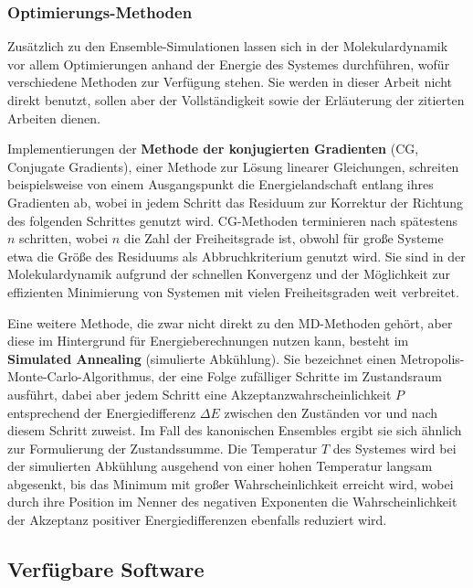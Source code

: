 \subsubsection{Optimierungs-Methoden}
\label{conjugategradient}
\label{annealing}

Zusätzlich zu den Ensemble-Simulationen lassen sich in der Molekulardynamik vor allem Optimierungen anhand der Energie des Systemes durchführen, wofür verschiedene Methoden zur Verfügung stehen.
Sie werden in dieser Arbeit nicht direkt benutzt, sollen aber der Vollständigkeit sowie der Erläuterung der zitierten Arbeiten dienen.

Implementierungen der \textbf{Methode der konjugierten Gradienten} (CG, Conjugate Gradients), einer Methode zur Lösung linearer Gleichungen, schreiten beispielsweise von einem Ausgangspunkt die Energielandschaft entlang ihres Gradienten ab, wobei in jedem Schritt das Residuum zur Korrektur der Richtung des folgenden Schrittes genutzt wird.
CG-Methoden terminieren nach spätestens $n$ schritten, wobei $n$ die Zahl der Freiheitsgrade ist, obwohl für große Systeme etwa die Größe des Residuums als Abbruchkriterium genutzt wird.
Sie sind in der Molekulardynamik aufgrund der schnellen Konvergenz und der Möglichkeit zur effizienten Minimierung von Systemen mit vielen Freiheitsgraden weit verbreitet.

Eine weitere Methode, die zwar nicht direkt zu den MD-Methoden gehört, aber diese im Hintergrund für Energieberechnungen nutzen kann, besteht im \textbf{Simulated Annealing} (simulierte Abkühlung).
Sie bezeichnet einen Metropolis-Monte-Carlo-Algorithmus, der eine Folge zufälliger Schritte im Zustandsraum ausführt, dabei aber jedem Schritt eine Akzeptanzwahrscheinlichkeit $P$ entsprechend der Energiedifferenz $\Delta E$ zwischen den Zuständen vor und nach diesem Schritt zuweist.
Im Fall des kanonischen Ensembles ergibt sie sich ähnlich zur Formulierung der Zustandssumme.
Die Temperatur $T$ des Systemes wird bei der simulierten Abkühlung ausgehend von einer hohen Temperatur langsam abgesenkt, bis das Minimum mit großer Wahrscheinlichkeit erreicht wird, wobei durch ihre Position im Nenner des negativen Exponenten die Wahrscheinlichkeit der Akzeptanz positiver Energiedifferenzen ebenfalls reduziert wird.



\subsection{Verfügbare Software}

